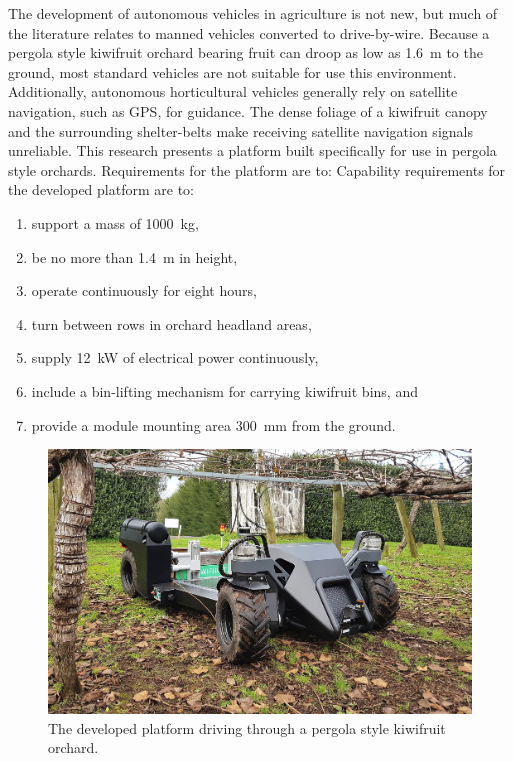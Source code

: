 \documentclass[preprint,authoryear,12pt]{elsarticle}
\begin{document}
    The development of autonomous vehicles in agriculture is not new, but much of the literature relates to manned vehicles converted to drive-by-wire.
    Because a pergola style kiwifruit orchard bearing fruit can droop as low as \SI{1.6}{\meter} to the ground, most standard vehicles are not suitable for use this environment.
    Additionally, autonomous horticultural vehicles generally rely on satellite navigation, such as GPS, for guidance.
    The dense foliage of a kiwifruit canopy and the surrounding shelter-belts make receiving satellite navigation signals unreliable.
    This research presents a platform built specifically for use in pergola style orchards.
    Requirements for the platform are to:
    Capability requirements for the developed platform are to:
    \begin{enumerate}
        \item support a mass of \SI{1000}{\kilo\gram},
        \item be no more than \SI{1.4}{\meter} in height,
        \item operate continuously for eight hours,
        \item turn between rows in orchard headland areas,
        \item supply \SI{12}{\kilo\watt} of electrical power continuously,
        \item include a bin-lifting mechanism for carrying kiwifruit bins, and
        \item provide a module mounting area \SI{300}{\milli\meter} from the ground.
    \end{enumerate}
    \begin{figure}[htb]
        \centering
        \includegraphics[width=\linewidth]{imgs/photos/suzy_general.jpg}
        \caption{
            The developed platform driving through a pergola style kiwifruit orchard.
        }
        \label{fig:suzy}
    \end{figure}
\end{document}
